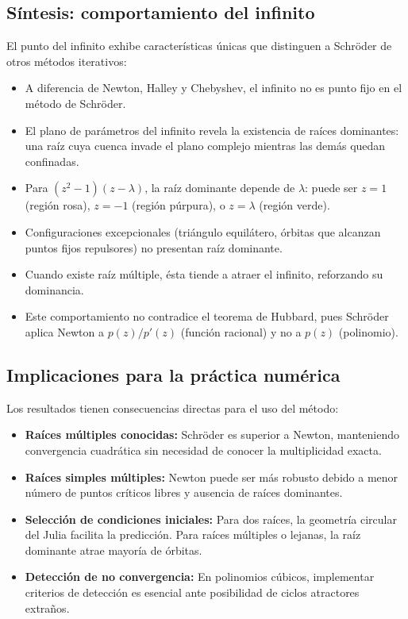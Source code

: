 \subsection{Síntesis: comportamiento del infinito}

El punto del infinito exhibe características únicas que distinguen a Schröder de otros métodos iterativos:

\begin{itemize}
\item A diferencia de Newton, Halley y Chebyshev, el infinito no es punto fijo en el método de Schröder.

\item El plano de parámetros del infinito revela la existencia de raíces dominantes: una raíz cuya cuenca invade el plano complejo mientras las demás quedan confinadas.

\item Para $(z^2-1)(z-\lambda)$, la raíz dominante depende de $\lambda$: puede ser $z=1$ (región rosa), $z=-1$ (región púrpura), o $z=\lambda$ (región verde).

\item Configuraciones excepcionales (triángulo equilátero, órbitas que alcanzan puntos fijos repulsores) no presentan raíz dominante.

\item Cuando existe raíz múltiple, ésta tiende a atraer el infinito, reforzando su dominancia.

\item Este comportamiento no contradice el teorema de Hubbard, pues Schröder aplica Newton a $p(z)/p'(z)$ (función racional) y no a $p(z)$ (polinomio).
\end{itemize}

\subsection{Implicaciones para la práctica numérica}

Los resultados tienen consecuencias directas para el uso del método:

\begin{itemize}
\item \textbf{Raíces múltiples conocidas:} Schröder es superior a Newton, manteniendo convergencia cuadrática sin necesidad de conocer la multiplicidad exacta.

\item \textbf{Raíces simples múltiples:} Newton puede ser más robusto debido a menor número de puntos críticos libres y ausencia de raíces dominantes.

\item \textbf{Selección de condiciones iniciales:} Para dos raíces, la geometría circular del Julia facilita la predicción. Para raíces múltiples o lejanas, la raíz dominante atrae mayoría de órbitas.

\item \textbf{Detección de no convergencia:} En polinomios cúbicos, implementar criterios de detección es esencial ante posibilidad de ciclos atractores extraños.
\end{itemize}

